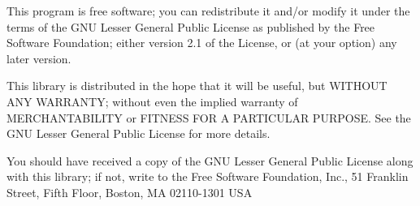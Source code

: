 \begin{DoxyVerb}   This program is free software; you can redistribute it and/or
   modify it under the terms of the GNU Lesser General Public
   License as published by the Free Software Foundation; either
   version 2.1 of the License, or (at your option) any later version.

   This library is distributed in the hope that it will be useful,
   but WITHOUT ANY WARRANTY; without even the implied warranty of
   MERCHANTABILITY or FITNESS FOR A PARTICULAR PURPOSE.  See the GNU
   Lesser General Public License for more details.

   You should have received a copy of the GNU Lesser General Public
   License along with this library; if not, write to the Free Software
   Foundation, Inc., 51 Franklin Street, Fifth Floor, Boston, MA  02110-1301  USA\end{DoxyVerb}
 